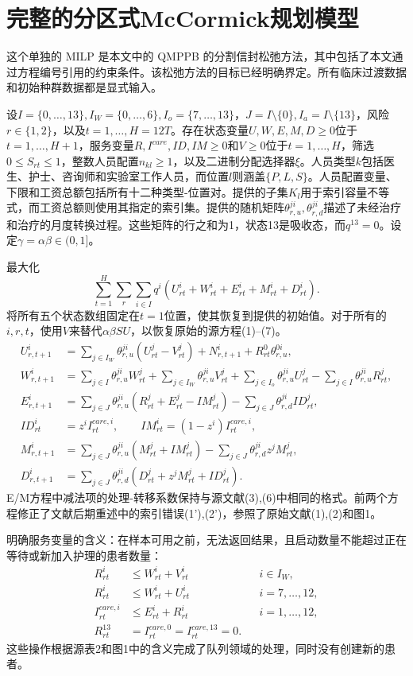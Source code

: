 \documentclass{article}
\begin{document}
\section*{完整的分区式McCormick规划模型}
这个单独的 MILP 是本文中的 QMPPB 的分割信封松弛方法，其中包括了本文通过方程编号引用的约束条件。该松弛方法的目标已经明确界定。所有临床过渡数据和初始种群数据都是显式输入。

设$I=\{0,\ldots,13\}, I_W=\{0,\ldots,6\},I_o=\{7,\ldots,13\}$，$J=I\setminus\{0\},I_a=I\setminus\{13\}$，风险$r\in\{1,2\}$，以及$t=1,\ldots,H=12T$。存在状态变量$U,W,E,M,D\ge0$位于$t=1,\ldots,H+1$，服务变量$R,I^{care},ID,IM\ge0$和$V\ge0$位于$t=1,\ldots,H$，筛选$0\le S_{rt}\le1$，整数人员配置$n_{kl}\ge1$，以及二进制分配选择器$\xi$。人员类型$k$包括医生、护士、咨询师和实验室工作人员，而位置$l$则涵盖$\{P,L,S\}$。人员配置变量、下限和工资总额包括所有十二种类型-位置对。提供的子集$K_l$用于索引容量不等式，而工资总额则使用其指定的索引集。提供的随机矩阵$\theta^{ji}_{r,u},\theta^{ji}_{r,d}$描述了未经治疗和治疗的月度转换过程。这些矩阵的行之和为1，状态13是吸收态，而$q^{13}=0$。设定$\gamma=\alpha\beta\in(0,1]$。

最大化
\[
\sum_{t=1}^H\sum_r\sum_{i\in I}q^i
(U^i_{rt}+W^i_{rt}+E^i_{rt}+M^i_{rt}+D^i_{rt}).
\]
将所有五个状态数组固定在$t=1$位置，使其恢复到提供的初始值。对于所有的$i,r,t$，使用$V$来替代$\alpha\beta SU$，以恢复原始的源方程(1)--(7)。
\begin{align*}
U^i_{r,t+1}
 &=\sum_{j\in I_W}\theta^{ji}_{r,u}(U^j_{rt}-V^j_{rt})
      +N^i_{r,t+1}+R^0_{rt}\theta^{0i}_{r,u},\\
W^i_{r,t+1}
 &=\sum_{j\in I}\theta^{ji}_{r,u}W^j_{rt}
    +\sum_{j\in I_W}\theta^{ji}_{r,u}V^j_{rt}
    +\sum_{j\in I_o}\theta^{ji}_{r,u}U^j_{rt}
    -\sum_{j\in I}\theta^{ji}_{r,u}R^j_{rt},\\
E^i_{r,t+1}
 &=\sum_{j\in J}\theta^{ji}_{r,u}(R^j_{rt}+E^j_{rt}-IM^j_{rt})
    -\sum_{j\in J}\theta^{ji}_{r,d}ID^j_{rt},\\
ID^i_{rt}&=z^i I^{care,i}_{rt},\qquad
IM^i_{rt}=(1-z^i)I^{care,i}_{rt},\\
M^i_{r,t+1}
 &=\sum_{j\in J}\theta^{ji}_{r,u}(M^j_{rt}+IM^j_{rt})
    -\sum_{j\in J}\theta^{ji}_{r,d}z^jM^j_{rt},\\
D^i_{r,t+1}
 &=\sum_{j\in J}\theta^{ji}_{r,d}(D^j_{rt}+z^jM^j_{rt}+ID^j_{rt}).
\end{align*}
E/M方程中减法项的处理-转移系数保持与源文献(3),(6)中相同的格式。前两个方程修正了文献后期重述中的索引错误(1'),(2')，参照了原始文献(1),(2)和图1。

明确服务变量的含义：在样本可用之前，无法返回结果，且启动数量不能超过正在等待或新加入护理的患者数量：
\begin{align*}
R^i_{rt}&\le W^i_{rt}+V^i_{rt}&&i\in I_W,\\
R^i_{rt}&\le W^i_{rt}+U^i_{rt}&&i=7,\ldots,12,\\
I^{care,i}_{rt}&\le E^i_{rt}+R^i_{rt}&&i=1,\ldots,12,\\
R^{13}_{rt}&=I^{care,0}_{rt}=I^{care,13}_{rt}=0.
\end{align*}
这些操作根据源表2和图1中的含义完成了队列领域的处理，同时没有创建新的患者。
\end{document}
